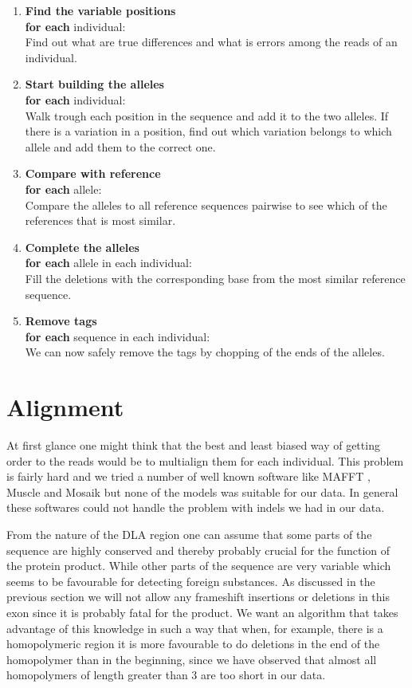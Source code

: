 \documentclass[a4paper,11pt]{kth-mag}
\begin{document}
\begin{itemize}
	\begin{enumerate}
		\item \textbf{Find the variable positions}\\
		\textbf{for each} individual:\\
		Find out what are true differences and what is errors among the reads of an individual.
		\item \textbf{Start building the alleles}\\
		\textbf{for each} individual:\\
		Walk trough each position in the sequence and add it to the two alleles. If there is a variation in a position, find out which variation belongs to which allele and add them to the correct one. 
		\item \textbf{Compare with reference}\\
		\textbf{for each} allele:\\
		Compare the alleles to all reference sequences pairwise to see which of the references that is most similar.
		\item \textbf{Complete the alleles}\\
		\textbf{for each} allele in each individual:\\
		Fill the deletions with the corresponding base from the most similar reference sequence.
		\item \textbf{Remove tags}\\
		\textbf{for each} sequence in each individual:\\
		We can now safely remove the tags by chopping of the ends of the alleles.
	\end{enumerate}	
\end{itemize}



\section{Alignment}

At first glance one might think that the best and least biased way of getting order to the reads would be to multialign them for each individual. This problem is fairly hard and we tried a number of well known software like MAFFT \cite{mafft} , Muscle \cite{muscle} and Mosaik \cite{mosaik} but none of the models was suitable for our data. In general these softwares could not handle the problem with indels we had in our data.

From the nature of the DLA region one can assume that some parts of the sequence are highly conserved and thereby probably crucial for the function of the protein product. While other parts of the sequence are very variable which seems to be favourable for detecting foreign substances. As discussed in the previous section we will not allow any frameshift insertions or deletions in this exon since it is probably fatal for the product. We want an algorithm that takes advantage of this knowledge in such a way that when, for example, there is a homopolymeric region it is more favourable to do deletions in the end of the homopolymer than in the beginning, since we have observed that almost all homopolymers of length greater than 3 are too short in our data.
\end{document}
